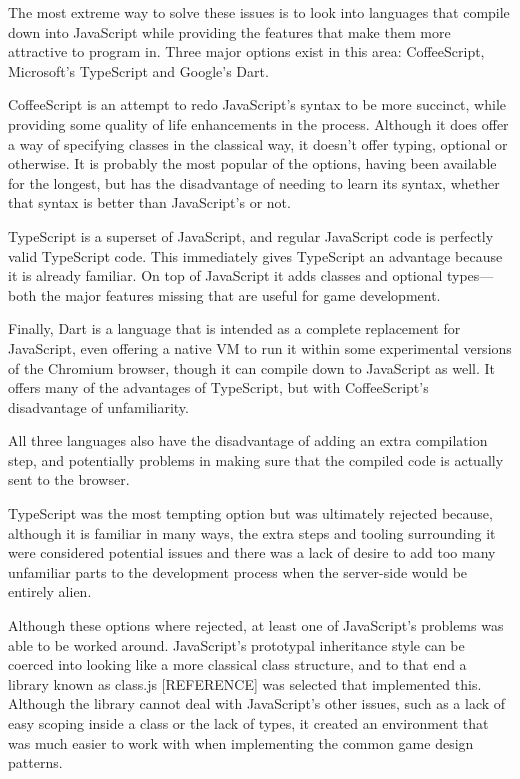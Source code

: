 The most extreme way to solve these issues is to look into languages that compile down into JavaScript while providing the features that make them more attractive to program in. Three major options exist in this area: CoffeeScript, Microsoft's TypeScript and Google's Dart.

CoffeeScript is an attempt to redo JavaScript's syntax to be more succinct, while providing some quality of life enhancements in the process. Although it does offer a way of specifying classes in the classical way, it doesn't offer typing, optional or otherwise. It is probably the most popular of the options, having been available for the longest, but has the disadvantage of needing to learn its syntax, whether that syntax is better than JavaScript's or not.

TypeScript is a superset of JavaScript, and regular JavaScript code is perfectly valid TypeScript code. This immediately gives TypeScript an advantage because it is already familiar. On top of JavaScript it adds classes and optional types---both the major features missing that are useful for game development.

Finally, Dart is a language that is intended as a complete replacement for JavaScript, even offering a native VM to run it within some experimental versions of the Chromium browser, though it can compile down to JavaScript as well. It offers many of the advantages of TypeScript, but with CoffeeScript's disadvantage of unfamiliarity.

All three languages also have the disadvantage of adding an extra compilation step, and potentially problems in making sure that the compiled code is actually sent to the browser.

TypeScript was the most tempting option but was ultimately rejected because, although it is familiar in many ways, the extra steps and tooling surrounding it were considered potential issues and there was a lack of desire to add too many unfamiliar parts to the development process when the server-side would be entirely alien.

Although these options where rejected, at least one of JavaScript's problems was able to be worked around. JavaScript's prototypal inheritance style can be coerced into looking like a more classical class structure, and to that end a library known as class.js [REFERENCE] was selected that implemented this. Although the library cannot deal with JavaScript's other issues, such as a lack of easy scoping inside a class or the lack of types, it created an environment that was much easier to work with when implementing the common game design patterns.

